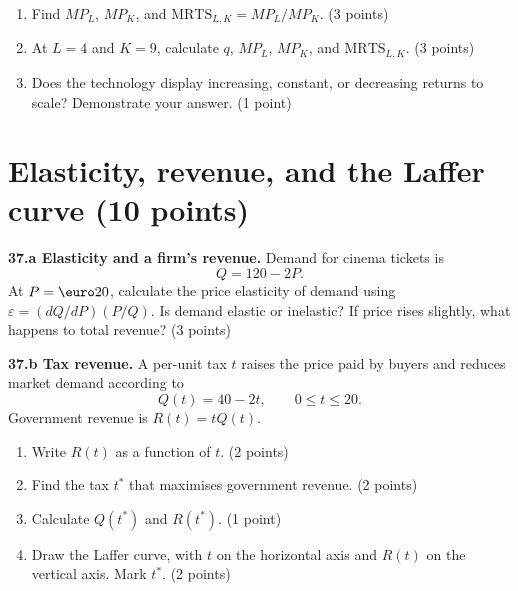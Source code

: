 \documentclass[11pt,a4paper]{article}
\begin{document}
\begin{enumerate}[label=\textbf{\alph*.}]
  \item Find \(MP_L\), \(MP_K\), and \(\mathrm{MRTS}_{L,K}=MP_L/MP_K\).
        \hfill (3 points)
  \item At \(L=4\) and \(K=9\), calculate \(q\), \(MP_L\), \(MP_K\), and
        \(\mathrm{MRTS}_{L,K}\). \hfill (3 points)
  \item Does the technology display increasing, constant, or decreasing
        returns to scale? Demonstrate your answer. \hfill (1 point)
\end{enumerate}

\newpage
\section{Elasticity, revenue, and the Laffer curve \hfill (10 points)}

\textbf{37.a Elasticity and a firm's revenue.} Demand for cinema tickets is
\[
Q=120-2P.
\]
At \(P=\text{\euro}20\), calculate the price elasticity of demand using
\(\varepsilon=(dQ/dP)(P/Q)\). Is demand elastic or inelastic? If price rises
slightly, what happens to total revenue? \hfill (3 points)

\vspace{0.6em}
\textbf{37.b Tax revenue.} A per-unit tax \(t\) raises the price paid by
buyers and reduces market demand according to
\[
Q(t)=40-2t,\qquad 0\leq t\leq20.
\]
Government revenue is \(R(t)=tQ(t)\).

\begin{enumerate}[label=(\roman*)]
  \item Write \(R(t)\) as a function of \(t\). \hfill (2 points)
  \item Find the tax \(t^*\) that maximises government revenue. \hfill (2 points)
  \item Calculate \(Q(t^*)\) and \(R(t^*)\). \hfill (1 point)
  \item Draw the Laffer curve, with \(t\) on the horizontal axis and
        \(R(t)\) on the vertical axis. Mark \(t^*\). \hfill (2 points)
\end{enumerate}

\begin{center}
\end{center}
\end{document}

